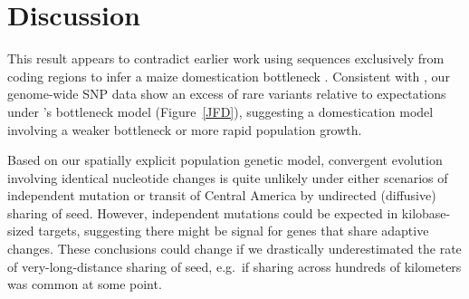 \section*{Discussion}

\label{historical models}
This result appears to contradict earlier work using sequences exclusively from coding regions to infer a maize domestication bottleneck \cite[]{Eyre-Walker_1998_9539756,Tenaillon_2004_15014173,Wright_2005_15919994}.  
Consistent with \citet{Hufford_2012_22660546}, our genome-wide SNP data show an excess of rare variants relative to expectations under \cite{Wright_2005_15919994}'s bottleneck model (Figure~\ref{JFD}), suggesting a domestication model involving a weaker bottleneck or more rapid population growth.

\label{no convergence} 
%

\label{theory comparison}
Based on our spatially explicit population genetic model, convergent evolution involving identical nucleotide changes is quite unlikely under either scenarios of independent mutation or transit of Central America by undirected (diffusive) sharing of seed. 
However, independent mutations could be expected in kilobase-sized targets, suggesting there might be signal for genes that share adaptive changes.
These conclusions could change if we drastically underestimated the rate of very-long-distance sharing of seed, e.g.\ if sharing across hundreds of kilometers was common at some point.

